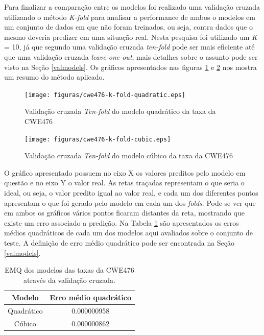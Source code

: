 Para finalizar a comparação entre os modelos foi realizado uma validação cruzada
utilizando o método \textit{K-fold} para analisar a performance de ambos o
modelos em um conjunto de dados em que não foram treinados, ou seja, contra
dados que o mesmo deveria predizer em uma situação real. Nesta pesquisa foi
utilizado um \textit{K} = 10, já que segundo  uma
validação cruzada \textit{ten-fold} pode ser mais eficiente até que uma
validação cruzada \textit{leave-one-out}, mais detalhes sobre o assunto pode ser
visto na Seção \ref{valmodels}. Os gráficos apresentados nas figuras
\ref{fig:cwe476-k-fold-quadratic} e \ref{fig:cwe476-k-fold-cubic} nos mostra um
resumo do método aplicado.

\begin{figure}[h]
  \centering
  \texttt{[image: figuras/cwe476-k-fold-quadratic.eps]}
      \caption{Validação cruzada \textit{Ten-fold} do modelo
      quadrático da taxa da CWE476}
  \label{fig:cwe476-k-fold-quadratic}
\end{figure}

\begin{figure}[h]
  \centering
  \texttt{[image: figuras/cwe476-k-fold-cubic.eps]}
      \caption{Validação cruzada \textit{Ten-fold} do modelo
      cúbico da taxa da CWE476}
  \label{fig:cwe476-k-fold-cubic}
\end{figure}

O gráfico apresentado possuem no eixo X os valores preditos pelo modelo em
questão e no eixo Y o valor real. As retas traçadas representam o que seria o
ideal, ou seja, o valor predito igual ao valor real, e cada um dos diferentes
pontos apresentam o que foi gerado pelo modelo em cada um dos \textit{folds}.
Pode-se ver que em ambos os gráficos vários pontos ficaram distantes da reta,
mostrando que existe um erro associado a predição. Na Tabela
\ref{tab:cwe476-emq} são apresentados os erros médios quadráticos de cada um dos
modelos aqui avaliados sobre o conjunto de teste. A definição de erro médio
quadrático pode ser encontrada na Seção \ref{valmodels}.

\begin{table}[h]
 \centering
 \begin{tabular}{cc}
  \hline
  \rowcolor[HTML]{EFEFEF} 
  {Modelo} & {Erro médio quadrático} \\ \hline
  Quadrático   & 0.000000958                  \\ \hline
  Cúbico       & 0.000000862                 \\ \hline
 \end{tabular}
 \caption{EMQ dos modelos das taxas da CWE476 através da validação cruzada.}
 \label{tab:cwe476-emq}
\end{table}

